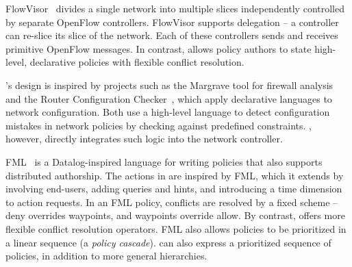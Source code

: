 FlowVisor~\cite{Sherwood:2010} divides a single network into multiple slices
independently controlled by separate OpenFlow controllers. FlowVisor
supports delegation -- a controller can re-slice its slice of the
network. Each of these controllers sends and receives primitive
OpenFlow messages. In contrast, \sys allows policy authors to
state high-level, declarative policies with flexible conflict resolution.





\sys's design is inspired by projects such as the Margrave tool for firewall 
analysis~\cite{Nelson:2010} and the Router Configuration
Checker~\cite{Feamster:2005}, which apply declarative languages to
network configuration. Both use a high-level language to detect configuration 
mistakes in network policies by checking against predefined constraints. 
\sys, however, directly integrates such logic into the network
controller.

FML~\cite{Hinrichs:2009} is a Datalog-inspired language for writing
policies that also supports distributed authorship.  
The actions in \sys are inspired by
FML, which it
extends by involving end-users, adding queries and hints, and
introducing a time dimension to action requests.
In an FML policy,
conflicts are resolved by a fixed scheme -- deny overrides waypoints,
and waypoints override allow. By contrast, \sys offers more
flexible conflict resolution operators.
%
FML also allows policies to be prioritized in a linear sequence (a
\emph{policy cascade}). \sys can also express a prioritized sequence of
policies, in addition to more general hierarchies.  


